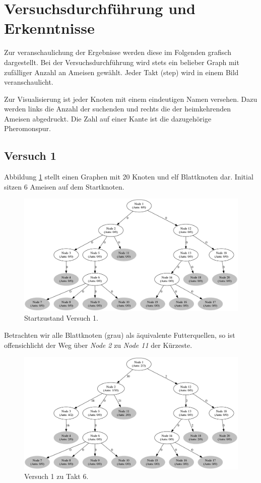 
\section{Versuchsdurchführung und Erkenntnisse}

Zur veranschaulichung der Ergebnisse werden diese im Folgenden grafisch dargestellt.
Bei der Versuchsdurchführung wird stets ein belieber Graph mit zufälliger Anzahl an Ameisen gewählt. Jeder Takt (step) wird in einem Bild veranschaulicht.\par
Zur Visualisierung ist jeder Knoten mit einem eindeutigen Namen versehen.
Dazu werden links die Anzahl der suchenden und rechts die der heimkehrenden Ameisen abgedruckt.
Die Zahl auf einer Kante ist die dazugehörige Pheromonspur.

\subsection{Versuch 1}
Abbildung \ref{fig:v1} stellt einen Graphen mit 20 Knoten und elf Blattknoten dar. Initial sitzen 6 Ameisen auf dem Startknoten.

\begin{figure}[htbp]
	\includegraphics[width=.9\textwidth]{images/v1_1.png}
	\caption{Startzustand Versuch 1.}
	\label{fig:v1}
\end{figure}

Betrachten wir alle Blattknoten (grau) als äquivalente Futterquellen, so ist offensichlicht der Weg über \emph{Node 2} zu \emph{Node 11} der Kürzeste.

\begin{figure}[htbp]
	\includegraphics[width=.9\textwidth]{images/v1_6.png}
	\caption{Versuch 1 zu Takt 6.}
	\label{fig:v1_6}
\end{figure}

